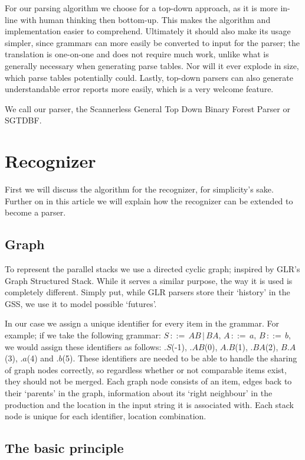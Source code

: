 \documentclass[a4paper,10pt]{article}
\begin{document}
For our parsing algorithm we choose for a top-down approach, as it is more in-line with human thinking then bottom-up. This makes the algorithm and implementation easier to comprehend. Ultimately it should also make its usage simpler, since grammars can more easily be converted to input for the parser; the translation is one-on-one and does not require much work, unlike what is generally necessary when generating parse tables. Nor will it ever explode in size, which parse tables potentially could. Lastly, top-down parsers can also generate understandable error reports more easily, which is a very welcome feature.

We call our parser, the Scannerless General Top Down Binary Forest Parser or SGTDBF.

\section{Recognizer}

First we will discuss the algorithm for the recognizer, for simplicity's sake. Further on in this article we will explain how the recognizer can be extended to become a parser.

\subsection{Graph}

To represent the parallel stacks we use a directed cyclic graph; inspired by GLR's Graph Structured Stack. While it serves a similar purpose, the way it is used is completely different. Simply put, while GLR parsers store their `history' in the GSS, we use it to model possible `futures'.

In our case we assign a unique identifier for every item in the grammar. For example; if we take the following grammar: $S\,::=\,AB\,|\,BA,\,A\,::=\,a,\,B\,::=\,b$, we would assign these identifiers as follows: $.S$(-1), $.AB$(0), $A.B$(1), $.BA$(2), $B.A$(3), $.a$(4) and $.b$(5). These identifiers are needed to be able to handle the sharing of graph nodes correctly, so regardless whether or not comparable items exist, they should not be merged. Each graph node consists of an item, edges back to their `parents' in the graph, information about its `right neighbour' in the production and the location in the input string it is associated with. Each stack node is unique for each identifier, location combination.

\subsection{The basic principle}
\end{document}

